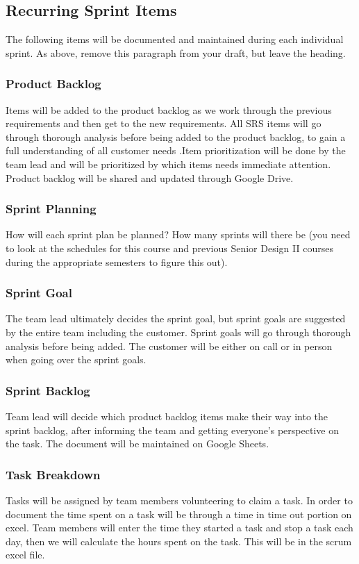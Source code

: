 \subsection{Recurring Sprint Items}
The following items will be documented and maintained during each individual sprint. As above, remove this paragraph from your draft, but leave the heading.

\subsubsection{Product Backlog}
Items will be added to the product backlog as we work through the previous requirements and then get to the new requirements. All SRS items will go through thorough analysis before being added to the product backlog, to gain a full understanding of all customer needs .Item prioritization will be done by the team lead and will be prioritized by which items needs immediate attention. Product backlog will be shared and updated through Google Drive.

\subsubsection{Sprint Planning}
How will each sprint plan be planned? How many sprints will there be (you need to look at the schedules for this course and previous Senior Design II courses during the appropriate semesters to figure this out).

\subsubsection{Sprint Goal}
The team lead ultimately decides the sprint goal, but sprint goals are suggested by the entire team including the customer. Sprint goals will go through thorough analysis before being added. The customer will be either on call or in person when going over the sprint goals.

\subsubsection{Sprint Backlog}
Team lead will decide which product backlog items make their way into the sprint backlog, after informing the team and getting everyone's perspective on the task. The document will be maintained on Google Sheets. 

\subsubsection{Task Breakdown}
Tasks will be assigned by team members volunteering to claim a task. In order to document the time spent on a task will be through a time in time out portion on excel. Team members will enter the time they started a task and stop a task each day, then we will calculate the hours spent on the task. This will be in the scrum excel file.

